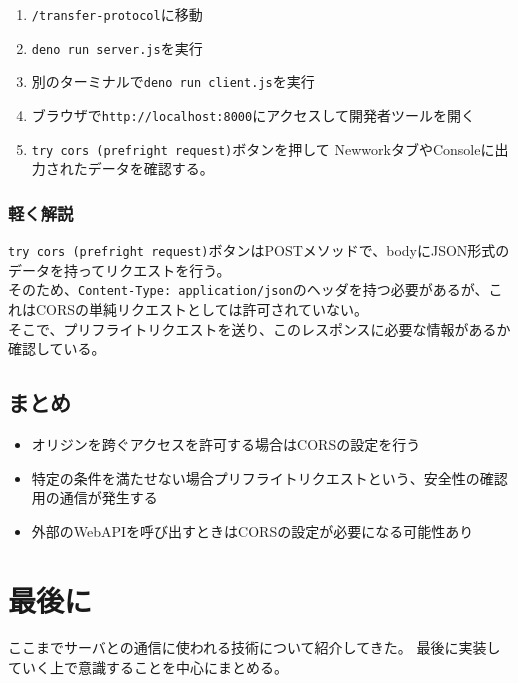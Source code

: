 \begin{enumerate}
\def\labelenumi{\arabic{enumi}.}
\tightlist
\item
  \texttt{/transfer-protocol}に移動
\item
  \texttt{deno\ run\ server.js}を実行
\item
  別のターミナルで\texttt{deno\ run\ client.js}を実行
\item
  ブラウザで\texttt{http://localhost:8000}にアクセスして開発者ツールを開く
\item
  \texttt{try\ cors\ (prefright\ request)}ボタンを押して
  NewworkタブやConsoleに出力されたデータを確認する。
\end{enumerate}

\subsubsection{軽く解説}\label{ux8efdux304fux89e3ux8aac-1}

\texttt{try\ cors\ (prefright\ request)}ボタンはPOSTメソッドで、bodyにJSON形式のデータを持ってリクエストを行う。\\
そのため、\texttt{Content-Type:\ application/json}のヘッダを持つ必要があるが、これはCORSの単純リクエストとしては許可されていない。\\
そこで、プリフライトリクエストを送り、このレスポンスに必要な情報があるか確認している。

\subsection{まとめ}\label{ux307eux3068ux3081-2}

\begin{itemize}
\tightlist
\item
  オリジンを跨ぐアクセスを許可する場合はCORSの設定を行う
\item
  特定の条件を満たせない場合プリフライトリクエストという、安全性の確認用の通信が発生する
\item
  外部のWebAPIを呼び出すときはCORSの設定が必要になる可能性あり
\end{itemize}

\section{最後に}\label{ux6700ux5f8cux306b}

ここまでサーバとの通信に使われる技術について紹介してきた。
最後に実装していく上で意識することを中心にまとめる。

